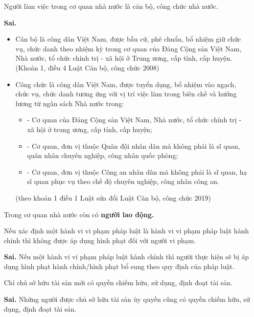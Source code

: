 \begin{ques}
Người làm việc trong cơ quan nhà nước là cán bộ, công chức nhà nước.
\end{ques}
\begin{ans}
\textbf{Sai.}\\
\begin{itemize}
\item Cán bộ là công dân Việt Nam, được bầu cử, phê chuẩn, bổ nhiệm giữ chức vụ, chức danh theo nhiệm kỳ trong cơ quan của Đảng Cộng sản Việt Nam, Nhà nước, tổ chức chính trị - xã hội ở Trung ương, cấp tỉnh, cấp huyện. (Khoản 1, điều 4 Luật Cán bộ, công chức 2008)
\item Công chức là công dân Việt Nam, được tuyển dụng, bổ nhiệm vào ngạch, chức vụ, chức danh tương ứng với vị trí việc làm trong biên chế và hưởng lương từ ngân sách Nhà nước trong:
\begin{itemize}
\item - Cơ quan của Đảng Cộng sản Việt Nam, Nhà nước, tổ chức chính trị - xã hội ở trung ương, cấp tỉnh, cấp huyện;
\item - Cơ quan, đơn vị thuộc Quân đội nhân dân mà không phải là sĩ quan, quân nhân chuyên nghiệp, công nhân quốc phòng;
\item - Cơ quan, đơn vị thuộc Công an nhân dân mà không phải là sĩ quan, hạ sĩ quan phục vụ theo chế độ chuyên nghiệp, công nhân công an.
\end{itemize}
(theo khoản 1 điều 1 Luật sửa đổi Luật Cán bộ, công chức 2019)
\end{itemize}
Trong cơ quan nhà nước còn có \textbf{người lao động.}
\end{ans}

\begin{ques}
Nếu xác định một hành vi vi phạm pháp luật là hành vi vi phạm pháp luật hành chính thì không được áp dụng hình phạt đối với người vi phạm.
\end{ques}
\begin{ans}
\textbf{Sai.} Nếu một hành vi vi phạm pháp luật hành chính thì người thực hiện sẽ bị áp dụng hình phạt hành chính/hình phạt bổ sung theo quy định của pháp luật.
\end{ans}

\begin{ques}
Chỉ chủ sở hữu tài sản mới có quyền chiếm hữu, sử dụng, định đoạt tài sản.
\end{ques}
\begin{ans}
\textbf{Sai.} Những người được chủ sở hữu tài sản ủy quyền cũng có quyền chiếm hữu, sử dụng, định đoạt tài sản.
\end{ans}

